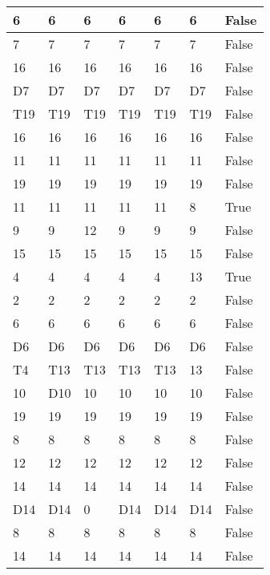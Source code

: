 \begin{longtable}[htbp]{| p{} | p{} | p{}| p{}| p{}| p{}| p{}|}
6 & 6 & 6 & 6 & 6 & 6 & False \\ \hline
7 & 7 & 7 & 7 & 7 & 7 & False \\ \hline
16 & 16 & 16 & 16 & 16 & 16 & False \\ \hline
\multicolumn{1}{|l|}{D7} & \multicolumn{1}{l|}{D7} & \multicolumn{1}{l|}{D7} & \multicolumn{1}{l|}{D7} & \multicolumn{1}{l|}{D7} & \multicolumn{1}{l|}{D7} & False \\ \hline
\multicolumn{1}{|l|}{T19} & \multicolumn{1}{l|}{T19} & \multicolumn{1}{l|}{T19} & \multicolumn{1}{l|}{T19} & \multicolumn{1}{l|}{T19} & \multicolumn{1}{l|}{T19} & False \\ \hline
16 & 16 & 16 & 16 & 16 & 16 & False \\ \hline
11 & 11 & 11 & 11 & 11 & 11 & False \\ \hline
19 & 19 & 19 & 19 & 19 & 19 & False \\ \hline
11 & 11 & 11 & 11 & 11 & 8 & True \\ \hline
9 & 9 & 12 & 9 & 9 & 9 & False \\ \hline
15 & 15 & 15 & 15 & 15 & 15 & False \\ \hline
4 & 4 & 4 & 4 & 4 & 13 & True \\ \hline
2 & 2 & 2 & 2 & 2 & 2 & False \\ \hline
6 & 6 & 6 & 6 & 6 & 6 & False \\ \hline
\multicolumn{1}{|l|}{D6} & \multicolumn{1}{l|}{D6} & \multicolumn{1}{l|}{D6} & \multicolumn{1}{l|}{D6} & \multicolumn{1}{l|}{D6} & \multicolumn{1}{l|}{D6} & False \\ \hline
\multicolumn{1}{|l|}{T4} & \multicolumn{1}{l|}{T13} & \multicolumn{1}{l|}{T13} & \multicolumn{1}{l|}{T13} & \multicolumn{1}{l|}{T13} & 13 & False \\ \hline
10 & \multicolumn{1}{l|}{D10} & 10 & 10 & 10 & 10 & False \\ \hline
19 & 19 & 19 & 19 & 19 & 19 & False \\ \hline
8 & 8 & 8 & 8 & 8 & 8 & False \\ \hline
12 & 12 & 12 & 12 & 12 & 12 & False \\ \hline
14 & 14 & 14 & 14 & 14 & 14 & False \\ \hline
\multicolumn{1}{|l|}{D14} & \multicolumn{1}{l|}{D14} & 0 & \multicolumn{1}{l|}{D14} & \multicolumn{1}{l|}{D14} & \multicolumn{1}{l|}{D14} & False \\ \hline
8 & 8 & 8 & 8 & 8 & 8 & False \\ \hline
14 & 14 & 14 & 14 & 14 & 14 & False \\ \hline

\end{longtable}
